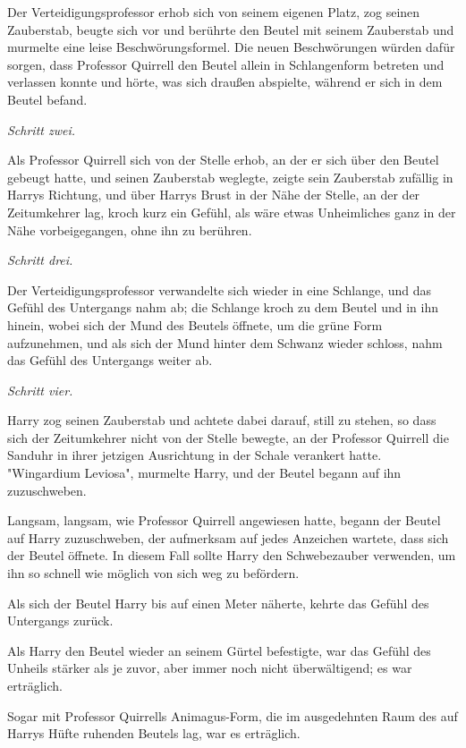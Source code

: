 {Der Verteidigungsprofessor erhob sich von seinem eigenen Platz, zog seinen Zauberstab, beugte sich vor und berührte den Beutel mit seinem Zauberstab und murmelte eine leise Beschwörungsformel. Die neuen Beschwörungen würden dafür sorgen, dass Professor Quirrell den Beutel allein in Schlangenform betreten und verlassen konnte und hörte, was sich draußen abspielte, während er sich in dem Beutel befand.

\emph{\emph{Schritt zwei.}}

Als Professor Quirrell sich von der Stelle erhob, an der er sich über den Beutel gebeugt hatte, und seinen Zauberstab weglegte, zeigte sein Zauberstab zufällig in Harrys Richtung, und über Harrys Brust in der Nähe der Stelle, an der der Zeitumkehrer lag, kroch kurz ein Gefühl, als wäre etwas Unheimliches ganz in der Nähe vorbeigegangen, ohne ihn zu berühren.

\emph{\emph{Schritt drei.}}

Der Verteidigungsprofessor verwandelte sich wieder in eine Schlange, und das Gefühl des Untergangs nahm ab; die Schlange kroch zu dem Beutel und in ihn hinein, wobei sich der Mund des Beutels öffnete, um die grüne Form aufzunehmen, und als sich der Mund hinter dem Schwanz wieder schloss, nahm das Gefühl des Untergangs weiter ab.

\emph{\emph{Schritt vier.}}

Harry zog seinen Zauberstab und achtete dabei darauf, still zu stehen, so dass sich der Zeitumkehrer nicht von der Stelle bewegte, an der Professor Quirrell die Sanduhr in ihrer jetzigen Ausrichtung in der Schale verankert hatte. "Wingardium Leviosa", murmelte Harry, und der Beutel begann auf ihn zuzuschweben.

Langsam, langsam, wie Professor Quirrell angewiesen hatte, begann der Beutel auf Harry zuzuschweben, der aufmerksam auf jedes Anzeichen wartete, dass sich der Beutel öffnete. In diesem Fall sollte Harry den Schwebezauber verwenden, um ihn so schnell wie möglich von sich weg zu befördern.

Als sich der Beutel Harry bis auf einen Meter näherte, kehrte das Gefühl des Untergangs zurück.

Als Harry den Beutel wieder an seinem Gürtel befestigte, war das Gefühl des Unheils stärker als je zuvor, aber immer noch nicht überwältigend; es war erträglich.

Sogar mit Professor Quirrells Animagus-Form, die im ausgedehnten Raum des auf Harrys Hüfte ruhenden Beutels lag, war es erträglich.

}

